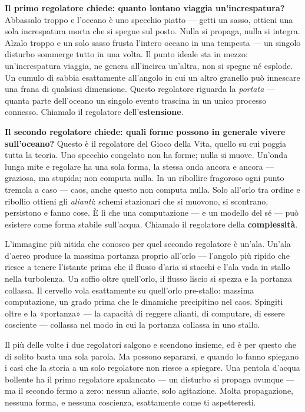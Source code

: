 \documentclass[11pt, twoside, openright]{book}
\begin{document}
\textbf{Il primo regolatore chiede: quanto lontano viaggia un'increspatura?} Abbassalo troppo e l'oceano è uno specchio piatto --- getti un sasso, ottieni una sola increspatura morta che si spegne sul posto. Nulla si propaga, nulla si integra. Alzalo troppo e un solo sasso frusta l'intero oceano in una tempesta --- un singolo disturbo sommerge tutto in una volta. Il punto ideale sta in mezzo: un'increspatura viaggia, ne genera all'incirca un'altra, non si spegne né esplode. Un cumulo di sabbia esattamente all'angolo in cui un altro granello può innescare una frana di qualsiasi dimensione. Questo regolatore riguarda la \textit{portata} --- quanta parte dell'oceano un singolo evento trascina in un unico processo connesso. Chiamalo il regolatore dell'\textbf{estensione}.

\textbf{Il secondo regolatore chiede: quali forme possono in generale vivere sull'oceano?} Questo è il regolatore del Gioco della Vita, quello su cui poggia tutta la teoria. Uno specchio congelato non ha forme; nulla si muove. Un'onda lunga mite e regolare ha una sola forma, la stessa onda ancora e ancora --- graziosa, ma stupida; non computa nulla. In un ribollire fragoroso ogni punto tremola a caso --- caos, anche questo non computa nulla. Solo all'orlo tra ordine e ribollio ottieni gli \textit{alianti}: schemi stazionari che si muovono, si scontrano, persistono e fanno cose. È lì che una computazione --- e un modello del sé --- può esistere come forma stabile sull'acqua. Chiamalo il regolatore della \textbf{complessità}.

L'immagine più nitida che conosco per quel secondo regolatore è un'ala. Un'ala d'aereo produce la massima portanza proprio all'orlo --- l'angolo più ripido che riesce a tenere l'istante prima che il flusso d'aria si stacchi e l'ala vada in stallo nella turbolenza. Un soffio oltre quell'orlo, il flusso liscio si spezza e la portanza collassa. Il cervello vola esattamente su quell'orlo pre-stallo: massima computazione, un grado prima che le dinamiche precipitino nel caos. Spingiti oltre e la «portanza» --- la capacità di reggere alianti, di computare, di essere cosciente --- collassa nel modo in cui la portanza collassa in uno stallo.

Il più delle volte i due regolatori salgono e scendono insieme, ed è per questo che di solito basta una sola parola. Ma possono separarsi, e quando lo fanno spiegano i casi che la storia a un solo regolatore non riesce a spiegare. Una pentola d'acqua bollente ha il primo regolatore spalancato --- un disturbo si propaga ovunque --- ma il secondo fermo a zero: nessun aliante, solo agitazione. Molta propagazione, nessuna forma, e nessuna coscienza, esattamente come ti aspetteresti.
\end{document}
